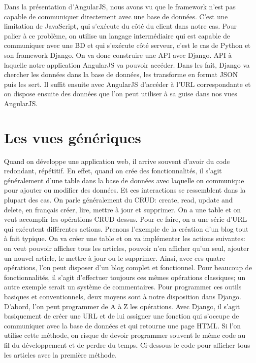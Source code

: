 \documentclass[letterpaper,10pt,oneside]{sphinxmanual}
\begin{document}
Dans la présentation d'AngularJS, nous avons vu que le framework n'est pas capable de communiquer directement avec une base de données. C'est une limitation de JavaScript, qui s'exécute du côté du client dans notre cas. Pour palier à ce problème, on utilise un langage intermédiaire qui est capable de communiquer avec une BD et qui s'exécute côté serveur, c'est le cas de Python et son framework Django. On va donc construire une API avec Django. API à laquelle notre application AngularJS va pouvoir accéder. Dans les fait, Django va chercher les données dans la base de données, les transforme en format JSON puis les sert. Il suffit ensuite avec AngularJS d'accéder à l'URL correspondante et on dispose ensuite des données que l'on peut utiliser à sa guise dans nos vues AngularJS.


\section{Les vues génériques}
\label{restless:les-vues-generiques}
Quand on développe une application web, il arrive souvent d'avoir du code redondant, répétitif. En effet, quand on crée des fonctionnalités, il s'agit généralement d'une table dans la base de données avec laquelle on communique pour ajouter ou modifier des données. Et ces interactions se ressemblent dans la plupart des cas. On parle généralement du CRUD: create, read, update and delete, en français créer, lire, mettre à jour et supprimer. On a une table et on veut accomplir les opérations CRUD dessus. Pour ce faire, on a une série d'URL qui exécutent différentes actions. Prenons l'exemple de la création d'un blog tout à fait typique. On va créer une table  et on va implémenter les actions suivantes: on veut pouvoir afficher tous les articles, pouvoir n'en afficher qu'un seul, ajouter un nouvel article, le mettre à jour ou le supprimer. Ainsi, avec ces quatre opérations, l'on peut disposer d'un blog complet et fonctionnel. Pour beaucoup de fonctionnalités, il s'agit d'effectuer toujours ces mêmes opérations classiques; un autre exemple serait un système de commentaires. Pour programmer ces outils basiques et conventionnels, deux moyens sont à notre disposition dans Django. D'abord, l'on peut programmer de A à Z les opérations. Avec Django, il s'agit basiquement de créer une URL et de lui assigner une fonction qui s'occupe de communiquer avec la base de données et qui retourne une page HTML. Si l'on utilise cette méthode, on risque de devoir programmer souvent le même code au fil du développement et de perdre du temps. Ci-dessous le code pour afficher tous les articles avec la première méthode.
\end{document}

